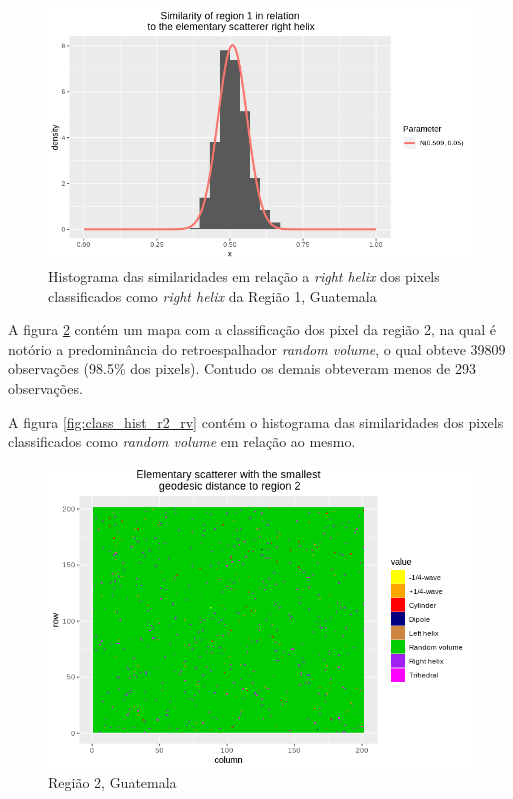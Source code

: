 \documentclass[12pt]{article}
\begin{document}
\begin{figure}[!h]
    \centering    
    \vspace{0.1\linewidth}
    \includegraphics[width = 0.95\linewidth]{../../Images/Report_18_12_20/Classifier_Geo_Dist/Histograms/Guate/region1_rh_sm_filter.png}
    \caption{Histograma das similaridades em relação a \textit{right helix} dos pixels classificados como \textit{right helix} da Região 1, Guatemala}
    \label{fig:class_hist_r1_rh}
\end{figure}

\newpage

A figura \ref{fig:class_map_r2} contém um mapa com a classificação dos pixel da região 2, na qual é notório a predominância do retroespalhador \textit{random volume}, o qual obteve 39809 observações (98.5\% dos pixels). Contudo os demais obteveram menos de 293 observações. 

A figura \ref{fig:class_hist_r2_rv} contém o histograma das similaridades dos pixels classificados como \textit{random volume} em relação ao mesmo.

\begin{figure}[!h]
    \centering    
    \includegraphics[width = \linewidth]{../../Images/Report_18_12_20/Classifier_Geo_Dist/Class_Map/Guate/region2_predomain.png}
    \caption{Região 2, Guatemala}
    \label{fig:class_map_r2}
\end{figure}
\end{document}
